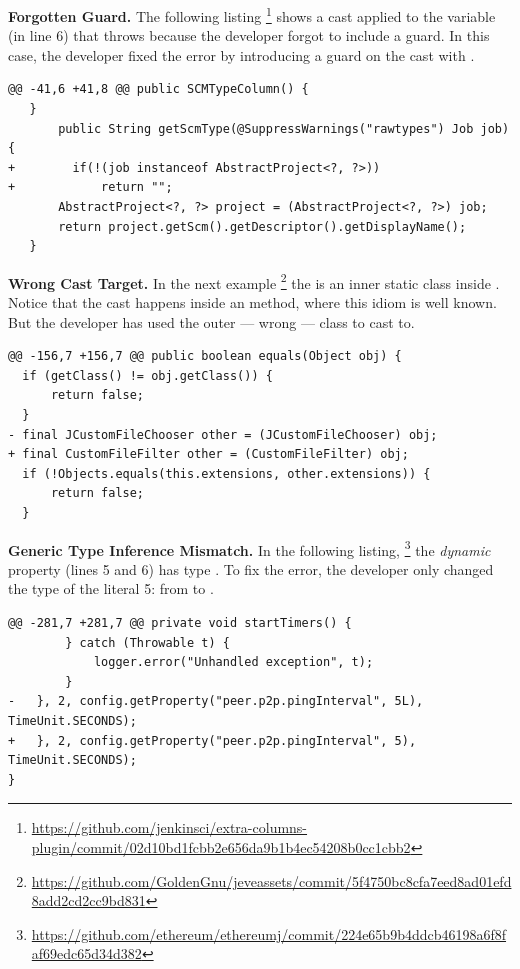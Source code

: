 \textbf{Forgotten Guard.}
The following listing%
\footnote{\url{https://github.com/jenkinsci/extra-columns-plugin/commit/02d10bd1fcbb2e656da9b1b4ec54208b0cc1cbb2}}
shows a cast applied to the variable  (in line 6) that throws  because the developer forgot to include a guard.
In this case, the developer fixed the error by introducing a guard on the cast with .

\begin{lstlisting}[style=java]
@@ -41,6 +41,8 @@ public SCMTypeColumn() {
   }
       public String getScmType(@SuppressWarnings("rawtypes") Job job) {
+        if(!(job instanceof AbstractProject<?, ?>))
+            return "";
       AbstractProject<?, ?> project = (AbstractProject<?, ?>) job;
       return project.getScm().getDescriptor().getDisplayName();
   }
\end{lstlisting}

\textbf{Wrong Cast Target.}
In the next example%
\footnote{\url{https://github.com/GoldenGnu/jeveassets/commit/5f4750bc8cfa7eed8ad01efd8add2cd2cc9bd831}}
the  is an inner static class inside .
Notice that the cast happens inside an  method, where this idiom is well known.
But the developer has used the outer --- wrong --- class to cast to.

\begin{lstlisting}[style=java]
@@ -156,7 +156,7 @@ public boolean equals(Object obj) {
  if (getClass() != obj.getClass()) {
      return false;
  }
- final JCustomFileChooser other = (JCustomFileChooser) obj;
+ final CustomFileFilter other = (CustomFileFilter) obj;
  if (!Objects.equals(this.extensions, other.extensions)) {
      return false;
  }
\end{lstlisting}

\textbf{Generic Type Inference Mismatch.}
In the following listing,%
\footnote{\url{https://github.com/ethereum/ethereumj/commit/224e65b9b4ddcb46198a6f8faf69edc65d34d382}}
the \emph{dynamic} property  (lines 5 and 6) has type .
To fix the error, the developer only changed the type of the
literal 5: from  to .

\begin{lstlisting}[style=java]
@@ -281,7 +281,7 @@ private void startTimers() {
        } catch (Throwable t) {
            logger.error("Unhandled exception", t);
        }
-   }, 2, config.getProperty("peer.p2p.pingInterval", 5L), TimeUnit.SECONDS);
+   }, 2, config.getProperty("peer.p2p.pingInterval", 5), TimeUnit.SECONDS);
}
\end{lstlisting}

